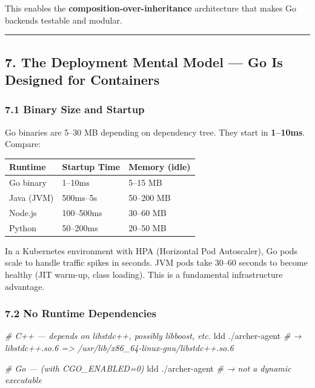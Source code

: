 \documentclass[
]{article}
\newenvironment{Shaded}{}{}
\newcommand{\CommentTok}[1]{\textcolor[rgb]{0.38,0.63,0.69}{\textit{#1}}}
\newcommand{\FunctionTok}[1]{\textcolor[rgb]{0.02,0.16,0.49}{#1}}
\newcommand{\NormalTok}[1]{#1}
\begin{document}
This enables the \textbf{composition-over-inheritance} architecture that
makes Go backends testable and modular.

\begin{center}\rule{0.5\linewidth}{0.5pt}\end{center}

\hypertarget{the-deployment-mental-model-go-is-designed-for-containers}{%
\subsection{7. The Deployment Mental Model --- Go Is Designed for
Containers}\label{the-deployment-mental-model-go-is-designed-for-containers}}

\hypertarget{binary-size-and-startup}{%
\subsubsection{7.1 Binary Size and
Startup}\label{binary-size-and-startup}}

Go binaries are 5--30 MB depending on dependency tree. They start in
\textbf{1--10ms}. Compare:

\begin{longtable}[]{@{}lll@{}}
\toprule()
Runtime & Startup Time & Memory (idle) \\
\midrule()
\endhead
Go binary & 1--10ms & 5--15 MB \\
Java (JVM) & 500ms--5s & 50--200 MB \\
Node.js & 100--500ms & 30--60 MB \\
Python & 50--200ms & 20--50 MB \\
\bottomrule()
\end{longtable}

In a Kubernetes environment with HPA (Horizontal Pod Autoscaler), Go
pods scale to handle traffic spikes in seconds. JVM pods take 30--60
seconds to become healthy (JIT warm-up, class loading). This is a
fundamental infrastructure advantage.

\hypertarget{no-runtime-dependencies}{%
\subsubsection{7.2 No Runtime
Dependencies}\label{no-runtime-dependencies}}

\begin{Shaded}
\begin{Highlighting}[]
\CommentTok{\# C++ — depends on libstdc++, possibly libboost, etc.}
\FunctionTok{ldd}\NormalTok{ ./archer{-}agent}
\CommentTok{\# → libstdc++.so.6 =\textgreater{} /usr/lib/x86\_64{-}linux{-}gnu/libstdc++.so.6}

\CommentTok{\# Go — (with CGO\_ENABLED=0)}
\FunctionTok{ldd}\NormalTok{ ./archer{-}agent}
\CommentTok{\# → not a dynamic executable}
\end{Highlighting}
\end{Shaded}
\end{document}
